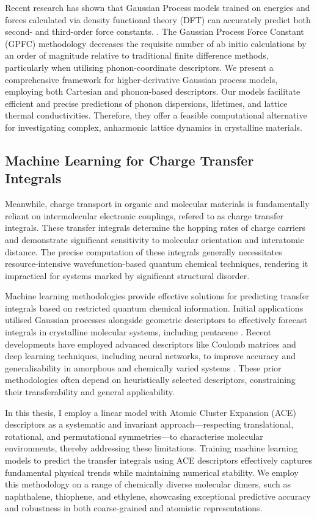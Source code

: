 Recent research has shown that Gaussian Process models trained on energies and forces calculated via density functional theory (DFT) can accurately predict both second- and third-order force constants. \cite{https://doi.org/10.48550/arxiv.2405.05113}.  The Gaussian Process Force Constant (GPFC) methodology decreases the requisite number of ab initio calculations by an order of magnitude relative to traditional finite difference methods, particularly when utilising phonon-coordinate descriptors.  We present a comprehensive framework for higher-derivative Gaussian process models, employing both Cartesian and phonon-based descriptors.  Our models facilitate efficient and precise predictions of phonon dispersions, lifetimes, and lattice thermal conductivities. Therefore, they offer a feasible computational alternative for investigating complex, anharmonic lattice dynamics in crystalline materials.

\subsection{Machine Learning for Charge Transfer Integrals}

Meanwhile, charge transport in organic and molecular materials is fundamentally reliant on intermolecular electronic couplings, refered to as charge transfer integrals.  These transfer integrals determine the hopping rates of charge carriers and demonstrate significant sensitivity to molecular orientation and interatomic distance.  The precise computation of these integrals generally necessitates resource-intensive wavefunction-based quantum chemical techniques, rendering it impractical for systems marked by significant structural disorder.

Machine learning methodologies provide effective solutions for predicting transfer integrals based on restricted quantum chemical information.  Initial applications utilised Gaussian processes alongside geometric descriptors to effectively forecast integrals in crystalline molecular systems, including pentacene \cite{Lederer2018}.  Recent developments have employed advanced descriptors like Coulomb matrices and deep learning techniques, including neural networks, to improve accuracy and generalisability in amorphous and chemically varied systems \cite{Wang2019}.  These prior methodologies often depend on heuristically selected descriptors, constraining their transferability and general applicability.

In this thesis, I employ a linear model with Atomic Cluster Expansion (ACE) descriptors as a systematic and invariant approach—respecting translational, rotational, and permutational symmetries—to characterise molecular environments, thereby addressing these limitations. Training machine learning models to predict the transfer integrals using ACE descriptors effectively captures fundamental physical trends while maintaining numerical stability. We employ this methodology on a range of chemically diverse molecular dimers, such as naphthalene, thiophene, and ethylene, showcasing exceptional predictive accuracy and robustness in both coarse-grained and atomistic representations.


